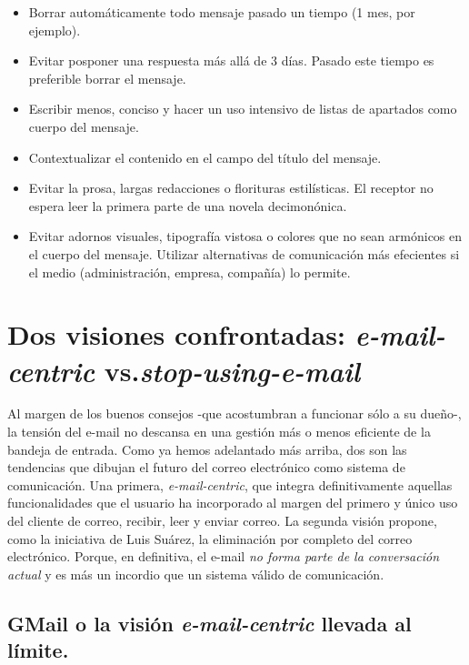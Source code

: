 \documentclass[12pt, a4paper,twoside]{book}
\begin{document}
\begin{itemize}
\item
  Borrar automáticamente todo mensaje pasado un tiempo (1 mes, por
  ejemplo).
\item
  Evitar posponer una respuesta más allá de 3 días. Pasado este
  tiempo es preferible borrar el mensaje.
\item
  Escribir menos, conciso y hacer un uso intensivo de listas de
  apartados como cuerpo del mensaje.
\item
  Contextualizar el contenido en el campo del título del mensaje.
\item
  Evitar la prosa, largas redacciones o florituras estilísticas. El
  receptor no espera leer la primera parte de una novela
  decimonónica.
\item
  Evitar adornos visuales, tipografía vistosa o colores que no sean
  armónicos en el cuerpo del mensaje. Utilizar alternativas de
  comunicación más efecientes si el medio (administración, empresa,
  compañía) lo permite.
\end{itemize}
\section{Dos visiones confrontadas: \emph{e-mail-centric} vs.\emph{stop-using-e-mail}}

Al margen de los buenos consejos -que acostumbran a funcionar sólo
a su dueño-, la tensión del e-mail no descansa en una gestión más o
menos eficiente de la bandeja de entrada. Como ya hemos adelantado
más arriba, dos son las tendencias que dibujan el futuro del correo
electrónico como sistema de comunicación. Una primera,
\emph{e-mail-centric}, que integra definitivamente aquellas
funcionalidades que el usuario ha incorporado al margen del primero
y único uso del cliente de correo, recibir, leer y enviar correo.
La segunda visión propone, como la iniciativa de Luis Suárez, la
eliminación por completo del correo electrónico. Porque, en
definitiva, el e-mail
\emph{no forma parte de la conversación actual} y es más un
incordio que un sistema válido de comunicación.

\subsection{GMail o la visión \emph{e-mail-centric} llevada al límite.}
\end{document}
